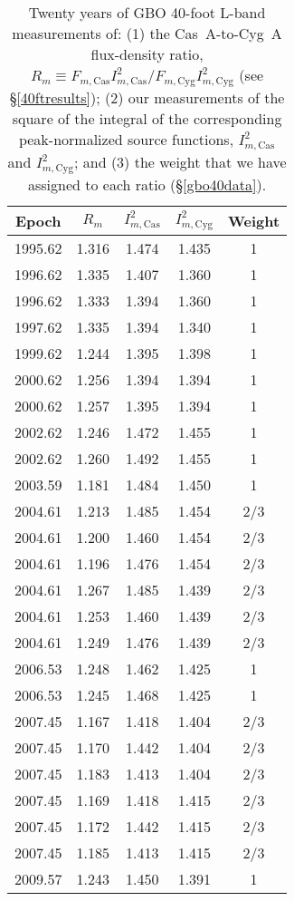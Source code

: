 \documentclass[fleqn,usenatbib]{mnras}
\newcommand{\Imcyg}{\mbox{$I^2_{m,\mathrm{Cyg}}$}}
\newcommand{\Imcas}{\mbox{$I^2_{m,\mathrm{Cas}}$}}
\newcommand{\Fmcyg}{\mbox{$F_{m, \mathrm{Cyg}}$}}
\newcommand{\Fmcas}{\mbox{$F_{m, \mathrm{Cas}}$}}
\begin{document}
\begin{table}
\caption{Twenty years of GBO 40-foot L-band measurements of:  (1) the Cas~A-to-Cyg~A flux-density ratio, $R_m\equiv \Fmcas\Imcas/\Fmcyg\Imcyg$ (see \S\ref{40ftresults}); (2) our measurements of the square of the integral of the corresponding peak-normalized source functions, $\Imcas$ and $\Imcyg$; and (3) the weight that we have assigned to each ratio (\S\ref{gbo40data}).}\label{tab1}
\centering
\begin{tabular}{c c c c c}
\hline 
\hline 
Epoch	&	$R_m$	&	$\Imcas$	&	$\Imcyg$	&	Weight	\\
\hline 
\hline 
1995.62	&	1.316	&	1.474	&	1.435	&	1	\\
1996.62	&	1.335	&	1.407	&	1.360	&	1	\\
1996.62	&	1.333	&	1.394	&	1.360	&	1	\\
1997.62	&	1.335	&	1.394	&	1.340	&	1	\\
1999.62	&	1.244	&	1.395	&	1.398	&	1	\\
2000.62	&	1.256	&	1.394	&	1.394	&	1	\\
2000.62	&	1.257	&	1.395	&	1.394	&	1	\\
2002.62	&	1.246	&	1.472	&	1.455	&	1	\\
2002.62	&	1.260	&	1.492	&	1.455	&	1	\\
2003.59	&	1.181	&	1.484	&	1.450	&	1	\\
2004.61	&	1.213	&	1.485	&	1.454	&	 2/3	\\
2004.61	&	1.200	&	1.460	&	1.454	&	 2/3	\\
2004.61	&	1.196	&	1.476	&	1.454	&	 2/3	\\
2004.61	&	1.267	&	1.485	&	1.439	&	 2/3	\\
2004.61	&	1.253	&	1.460	&	1.439	&	 2/3	\\
2004.61	&	1.249	&	1.476	&	1.439	&	 2/3	\\
2006.53	&	1.248	&	1.462	&	1.425	&	1	\\
2006.53	&	1.245	&	1.468	&	1.425	&	1	\\
2007.45	&	1.167	&	1.418	&	1.404	&	 2/3	\\
2007.45	&	1.170	&	1.442	&	1.404	&	 2/3	\\
2007.45	&	1.183	&	1.413	&	1.404	&	 2/3	\\
2007.45	&	1.169	&	1.418	&	1.415	&	 2/3	\\
2007.45	&	1.172	&	1.442	&	1.415	&	 2/3	\\
2007.45	&	1.185	&	1.413	&	1.415	&	 2/3	\\
2009.57	&	1.243	&	1.450	&	1.391	&	1	\\

\end{tabular}
\end{table}
\end{document}
